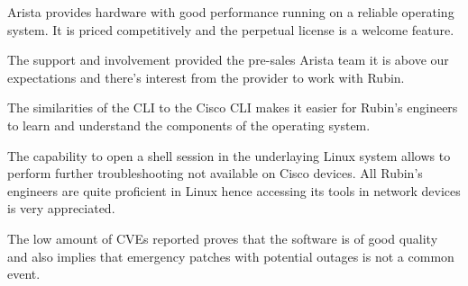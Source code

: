 Arista provides hardware with good performance running on a reliable operating system. It is priced competitively and the perpetual license is a welcome feature. 

The support and involvement provided the pre-sales Arista team it is above our expectations and there's interest from the provider to work with Rubin. 

The similarities of the CLI to the Cisco CLI makes it easier for Rubin's engineers to learn and understand the components of the operating system. 

The capability to open a shell session in the underlaying Linux system allows to perform further troubleshooting not available on Cisco devices. All Rubin's engineers are quite proficient in Linux hence accessing its tools in network devices is very appreciated. 

The low amount of CVEs reported proves that the software is of good quality and also implies that emergency patches with potential outages is not a common event. 